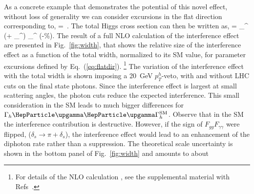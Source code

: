 As a concrete example that demonstrates the potential of this novel effect, without loss of generality
we can consider excursions in the flat direction corresponding to,
\be
{}
 =  \,.
\label{eq:flatdir}
\ee
The total Higgs cross section can then be written as,
\be
\sigma = \sigma_^\!\! \left(\!\!+\!  {\sigma_^}\right)
\simeq \sigma_^ \!\!\left(\!\!-\%\right)\!\!.\label{eq:deltasigma}
\ee
%
The result of a full NLO calculation of the interference effect are presented in Fig.~\ref{fig:width}, that shows the relative size of the interference effect as a function of the total width, normalized to its SM value, for parameter excursions defined by Eq.~(\ref{eq:flatdir}). 
\footnote{For details of the 
NLO calculation
, see the supplemental material 
with Refs~\cite{Bern:1991aq,Bern:2001df,Bern:1995db,Bern:1993mq,Bern:2002jx,deFlorian:2013psa,Catani:1996vz,Campbell:2011bn,Dulat:2015mca,Djouadi:1997rj,Degrassi:2005mc,Passarino:2007fp,Dittmaier:2011ti}.}
The variation of the interference effect with the total width is shown imposing a 20~GeV $p_T^{h}$-veto, with and without LHC cuts on the final state photons. %
Since the interference effect is largest at small scattering angles, the photon cuts reduce the expected interference.  
This small consideration in the SM leads to much
bigger differences for $\Gamma_h \gg \Gamma_h^{\rm SM}$.
Observe that in the SM the interference contribution is destructive. However,  if the sign of $F_{gg} F_{\gamma\gamma}$ were flipped, ($\delta_s\to \pi+\delta_s$), the interference effect would lead to an enhancement of the diphoton rate rather than a suppression. 
The theoretical scale uncertainty is shown in the bottom panel of Fig.~\ref{fig:width} and amounts to about 
